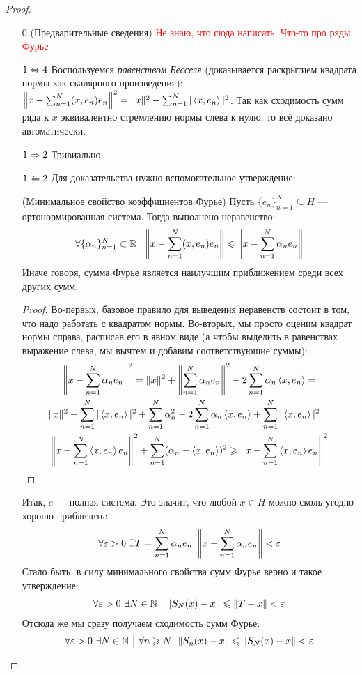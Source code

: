 \begin{proof}~
	\begin{itemize}
		\item[$0$] (Предварительные сведения) \textcolor{red}{Не знаю, что сюда написать. Что-то про ряды Фурье}
		
		\item[$1 \Leftrightarrow  4$] Воспользуемся \textit{равенством Бесселя} (доказывается раскрытием квадрата нормы как скалярного произведения): $\left\|x - \sum_{n = 1}^N (x, e_n)e_n\right\|^2 = \|x\|^2 - \sum_{n = 1}^N |\left\langle x, e_n\right\rangle|^2$. Так как сходимость сумм ряда к $x$ эквивалентно стремлению нормы слева к нулю, то всё доказано автоматически.
		
		\item[$1 \Rightarrow 2$] Тривиально
		
		\item[$1 \Leftarrow 2$] Для доказательства нужно вспомогательное утверждение:
		\begin{lemma} (Минимальное свойство коэффициентов Фурье)
			Пусть $\{e_n\}_{n = 1}^N \subseteq H$ --- ортонормированная система. Тогда выполнено неравенство:
			\[
				\forall \{\alpha_n\}_{n = 1}^N \subset \R\ \ \no{x - \sum_{n = 1}^N (x, e_n)e_n} \le \no{x - \sum_{n = 1}^N \alpha_n e_n}
			\]
			Иначе говоря, сумма Фурье является наилучшим приближением среди всех других сумм.
		\end{lemma}
	
		\begin{proof}
			Во-первых, базовое правило для выведения неравенств состоит в том, что надо работать с квадратом нормы. Во-вторых, мы просто оценим квадрат нормы справа, расписав его в явном виде (а чтобы выделить в равенствах выражение слева, мы вычтем и добавим соответствующие суммы):
			\begin{multline*}
				\left\|x - \sum_{n = 1}^N \alpha_n e_n\right\|^2 = \|x\|^2 + \left\|\sum_{n = 1}^N \alpha_n e_n\right\|^2 - 2\sum_{n = 1}^N \alpha_n \left\langle x, e_n\right\rangle =
				\\
				\|x\|^2 - \sum_{n = 1}^N |\left\langle x, e_n\right\rangle|^2 + \sum_{n = 1}^N \alpha_n^2 - 2\sum_{n = 1}^N \alpha_n\left\langle x, e_n\right\rangle + \sum_{n = 1}^N |\left\langle x, e_n\right\rangle|^2 =
				\\
				\left\|x - \sum_{n = 1}^N \left\langle x, e_n\right\rangle e_n\right\|^2 + \sum_{n = 1}^N (\alpha_n - \left\langle x, e_n\right\rangle)^2 \geqslant \left\|x - \sum_{n = 1}^N \left\langle x, e_n\right\rangle e_n\right\|^2
			\end{multline*}
		\end{proof}
		
		Итак, $e$ --- полная система. Это значит, что любой $x \in H$ можно сколь угодно хорошо приблизить:
		\[
			\forall \varepsilon > 0\ \exists T = \sum_{n = 1}^N \alpha_n e_n\ \left\|x - \sum_{n = 1}^N \alpha_n e_n\right\| < \varepsilon
		\]
		Стало быть, в силу минимального свойства сумм Фурье верно и такое утверждение:
		\[
			\forall \varepsilon > 0\ \exists N \in \mathbb{N} \ \big|\  \|S_N(x) - x\| \leqslant \|T - x\| < \varepsilon
		\]
		Отсюда же мы сразу получаем сходимость сумм Фурье:
		\[
			\forall \varepsilon > 0\ \exists N \in \mathbb{N} \ \big|\  \forall n \geqslant N\ \ \|S_n(x) - x\| \leqslant \|S_N(x) - x\| < \varepsilon
		\]
	

\end{itemize}
\end{proof}
